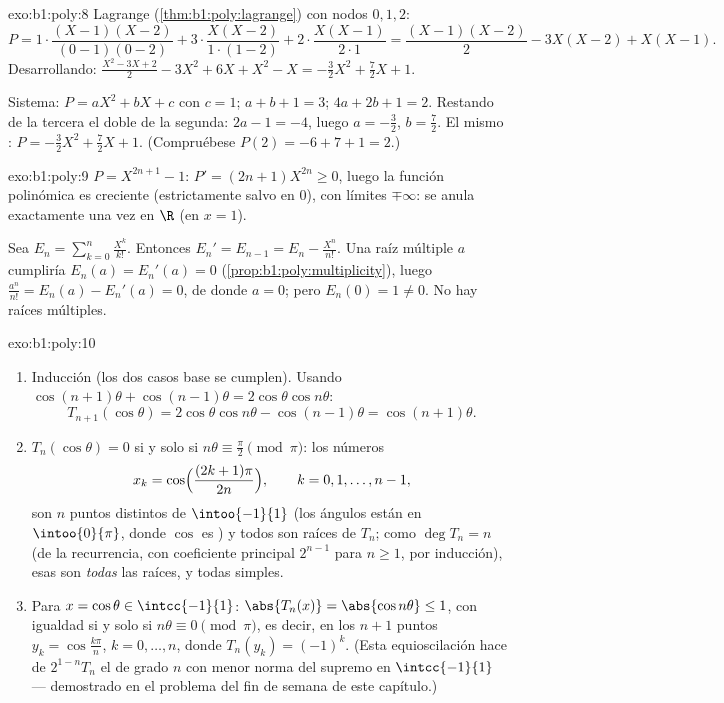\begin{solution}{exo:b1:poly:8}
Lagrange (\cref{thm:b1:poly:lagrange}) con nodos $0, 1, 2$:
\[
P = 1\cdot\frac{(X-1)(X-2)}{(0-1)(0-2)} + 3\cdot\frac{X(X-2)}{1\cdot(1-2)}
+ 2\cdot\frac{X(X-1)}{2\cdot 1}
= \frac{(X-1)(X-2)}{2} - 3X(X-2) + X(X-1).
\]
Desarrollando: $\frac{X^2 - 3X + 2}{2} - 3X^2 + 6X + X^2 - X =
-\frac{3}{2}X^2 + \frac{7}{2}X + 1$.

Sistema: $P = aX^2 + bX + c$ con $c = 1$; $a + b + 1 = 3$;
$4a + 2b + 1 = 2$. Restando de la tercera el doble de la segunda:
$2a - 1 = -4$, luego $a = -\frac32$, $b = \frac72$. El mismo
: $P = -\frac32 X^2 + \frac72 X + 1$. (Compruébese
$P(2) = -6 + 7 + 1 = 2$.)
\end{solution}

\begin{solution}{exo:b1:poly:9}
$P = X^{2n+1} - 1$: $P' = (2n+1)X^{2n} \geq 0$, luego la función
polinómica es creciente (estrictamente salvo en $0$), con límites
$\mp\infty$: se anula exactamente una vez en $\R$ (en $x = 1$).

Sea $E_n = \sum_{k=0}^{n} \frac{X^k}{k!}$. Entonces
$E_n' = E_{n-1} = E_n - \frac{X^n}{n!}$. Una raíz múltiple $a$ cumpliría
$E_n(a) = E_n'(a) = 0$ (\cref{prop:b1:poly:multiplicity}), luego
$\frac{a^n}{n!} = E_n(a) - E_n'(a) = 0$, de donde $a = 0$; pero
$E_n(0) = 1 \neq 0$. No hay raíces múltiples.
\end{solution}

\begin{solution}{exo:b1:poly:10}
\begin{enumerate}
  \item Inducción (los dos casos base se cumplen). Usando
        $\cos(n+1)\theta + \cos(n-1)\theta = 2\cos\theta\cos n\theta$:
        \[
        T_{n+1}(\cos\theta) = 2\cos\theta \cos n\theta -
        \cos(n-1)\theta = \cos(n+1)\theta .
        \]
  \item $T_n(\cos\theta) = 0$ si y solo si $n\theta \equiv \frac\pi2
        \pmod \pi$: los números
        \[
        x_k = \cos\Bigl(\frac{(2k+1)\pi}{2n}\Bigr),
        \qquad k = 0, 1, \dots, n-1,
        \]
        son $n$ puntos distintos de $\intoo{-1}{1}$ (los ángulos están
        en $\intoo{0}{\pi}$, donde $\cos$ es ) y todos son
        raíces de $T_n$; como $\deg T_n = n$ (de la recurrencia, con
        coeficiente principal $2^{n-1}$ para $n \geq 1$, por
        inducción), esas son \emph{todas} las raíces, y todas simples.
  \item Para $x = \cos\theta \in \intcc{-1}{1}$: $\abs{T_n(x)} =
        \abs{\cos n\theta} \leq 1$, con igualdad si y solo si
        $n\theta \equiv 0 \pmod\pi$, es decir, en los $n+1$ puntos
        $y_k = \cos\frac{k\pi}{n}$, $k = 0, \dots, n$, donde
        $T_n(y_k) = (-1)^k$. (Esta equioscilación hace de
        $2^{1-n}T_n$ el  de grado $n$ con menor norma
        del supremo en $\intcc{-1}{1}$ --- demostrado en el problema
        del fin de semana de este capítulo.)
\end{enumerate}
\end{solution}

